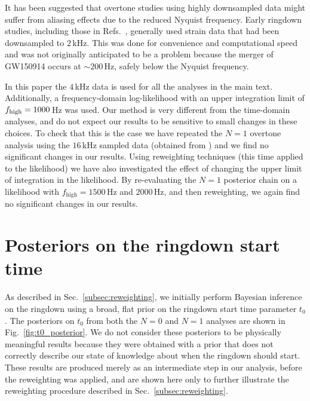 It has been suggested \cite{WillMaxTGRtelecon} that overtone studies using highly downsampled data might suffer from aliasing effects due to the reduced Nyquist frequency.
Early ringdown studies, including those in Refs.~\cite{LIGOScientific:2016lio, Isi:2019aib, Isi:2022mhy}, generally used strain data that had been downsampled to $2\,$kHz. 
This was done for convenience and computational speed and was not originally anticipated to be a problem because the merger of GW150914 occurs at $\sim 200\,\mathrm{Hz}$, safely below the Nyquist frequency.

In this paper the $4\,$kHz data is used for all the analyses in the main text. 
Additionally, a frequency-domain log-likelihood with an upper integration limit of $f_{\rm high}=1000\,$Hz was used.
Our method is very different from the time-domain analyses, and do not expect our results to be sensitive to small changes in these choices.
To check that this is the case we have repeated the $N=1$ overtone analysis using the $16\,$kHz sampled data (obtained from \cite{gwosc}) and we find no significant changes in our results.
Using reweighting techniques (this time applied to the likelihood) we have also investigated the effect of changing the upper limit of integration in the likelihood. By re-evaluating the $N=1$ posterior chain on a likelihood with $f_\mathrm{ high}=1500\,$Hz and $2000\,$Hz, and then reweighting, we again find no significant changes in our results.


\section{Posteriors on the ringdown start time}\label{app:t0_posterior_prior}

As described in Sec.~\ref{subsec:reweighting}, we initially perform Bayesian inference on the ringdown using a broad, flat prior on the ringdown start time parameter $t_0$. 
The posteriors on $t_0$ from both the $N=0$ and $N=1$ analyses are shown in Fig.~\ref{fig:t0_posterior}.
We do not consider these posteriors to be physically meaningful results because they were obtained with a prior that does not correctly describe our state of knowledge about when the ringdown should start.
These results are produced merely as an intermediate step in our analysis, before the reweighting was applied, and are shown here only to further illustrate the reweighting procedure described in Sec.~\ref{subsec:reweighting}.

